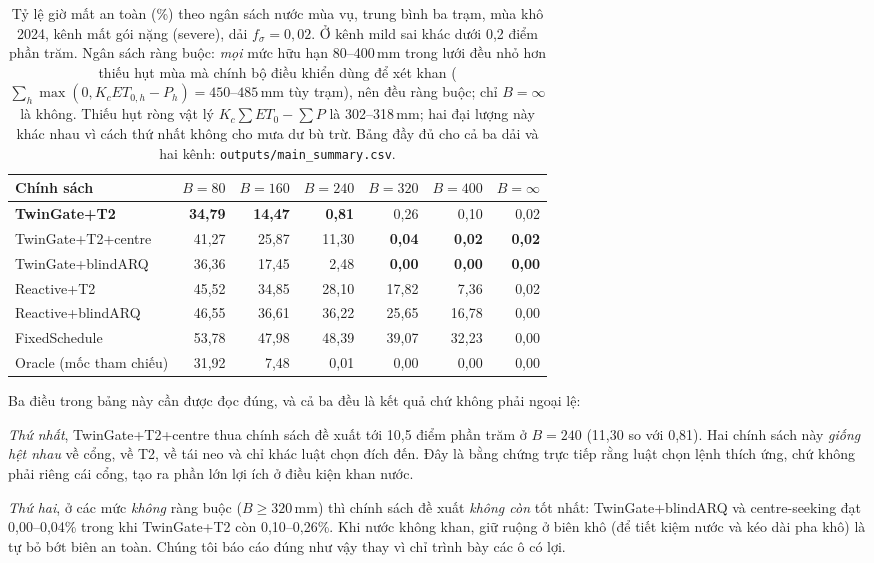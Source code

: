 \documentclass[10pt]{article}
\begin{document}
\begin{table}[t]
\centering
\caption{Tỷ lệ giờ mất an toàn (\%) theo ngân sách nước mùa vụ, trung bình ba trạm, mùa khô 2024, kênh mất gói nặng (severe), dải $f_\sigma=0{,}02$. Ở kênh mild sai khác dưới 0,2 điểm phần trăm. Ngân sách ràng buộc: \emph{mọi} mức hữu hạn 80--400\,mm trong lưới đều nhỏ hơn thiếu hụt mùa mà chính bộ điều khiển dùng để xét khan ($\sum_h\max(0, K_cET_{0,h}-P_h) = 450$--$485$\,mm tùy trạm), nên đều ràng buộc; chỉ $B=\infty$ là không. Thiếu hụt ròng vật lý $K_c\sum ET_0-\sum P$ là 302--318\,mm; hai đại lượng này khác nhau vì cách thứ nhất không cho mưa dư bù trừ. Bảng đầy đủ cho cả ba dải và hai kênh: \texttt{outputs/main\_summary.csv}.}
\label{tab:main2024}
\footnotesize
\begin{tabular}{@{}lrrrrrr@{}}
\toprule
Chính sách & $B{=}80$ & $B{=}160$ & $B{=}240$ & $B{=}320$ & $B{=}400$ & $B{=}\infty$ \\
\midrule
\textbf{TwinGate+T2} & \textbf{34,79} & \textbf{14,47} & \textbf{0,81} & 0,26 & 0,10 & 0,02 \\
TwinGate+T2+centre & 41,27 & 25,87 & 11,30 & \textbf{0,04} & \textbf{0,02} & \textbf{0,02} \\
TwinGate+blindARQ & 36,36 & 17,45 & 2,48 & \textbf{0,00} & \textbf{0,00} & \textbf{0,00} \\
Reactive+T2 & 45,52 & 34,85 & 28,10 & 17,82 & 7,36 & 0,02 \\
Reactive+blindARQ & 46,55 & 36,61 & 36,22 & 25,65 & 16,78 & 0,00 \\
FixedSchedule & 53,78 & 47,98 & 48,39 & 39,07 & 32,23 & 0,00 \\
Oracle (mốc tham chiếu) & 31,92 & 7,48 & 0,01 & 0,00 & 0,00 & 0,00 \\
\bottomrule
\end{tabular}
\end{table}

Ba điều trong bảng này cần được đọc đúng, và cả ba đều là kết quả chứ không phải ngoại lệ:

\emph{Thứ nhất}, TwinGate+T2+centre thua chính sách đề xuất tới 10,5 điểm phần trăm ở $B{=}240$ (11,30 so với 0,81). Hai chính sách này \emph{giống hệt nhau} về cổng, về T2, về tái neo và chỉ khác luật chọn đích đến. Đây là bằng chứng trực tiếp rằng luật chọn lệnh thích ứng, chứ không phải riêng cái cổng, tạo ra phần lớn lợi ích ở điều kiện khan nước.

\emph{Thứ hai}, ở các mức \emph{không} ràng buộc ($B\ge320$\,mm) thì chính sách đề xuất \emph{không còn} tốt nhất: TwinGate+blindARQ và centre-seeking đạt 0,00--0,04\% trong khi TwinGate+T2 còn 0,10--0,26\%. Khi nước không khan, giữ ruộng ở biên khô (để tiết kiệm nước và kéo dài pha khô) là tự bỏ bớt biên an toàn. Chúng tôi báo cáo đúng như vậy thay vì chỉ trình bày các ô có lợi.
\end{document}
